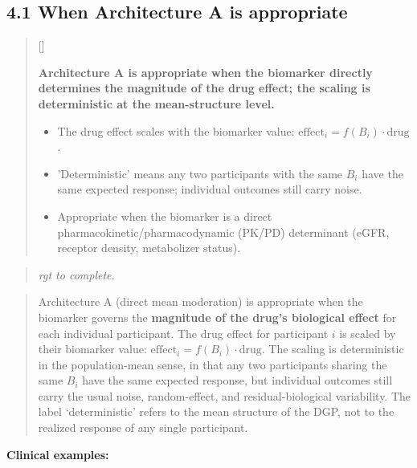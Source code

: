 \documentclass[
  11pt,
]{article}
\newcounter{pgraph}
\newenvironment{bullets}{%
  \stepcounter{pgraph}%
  \begin{quote}\small\sffamily\color[gray]{0.30}%
  {\normalfont\scriptsize\color[gray]{0.58}[\thepgraph]\enspace}}{%
  \end{quote}}
\newenvironment{rgt}{%
  \begin{quote}\small\itshape\color[RGB]{20,60,160}}{%
  \end{quote}}
\newenvironment{orig}{%
  \begin{quote}\normalsize\color[gray]{0.55}}{%
  \end{quote}}
\begin{document}
\subsection{4.1 When Architecture A is appropriate}

\begin{bullets}

\textbf{Architecture A is appropriate when the biomarker
directly determines the magnitude of the drug effect; the
scaling is deterministic at the mean-structure level.}

\begin{itemize}\setlength{\itemsep}{2pt}\setlength{\parskip}{0pt}
\item The drug effect scales with the biomarker value:
  $\text{effect}_i = f(B_i) \cdot \text{drug}$.
\item 'Deterministic' means any two participants with the same
  $B_i$ have the same expected response; individual outcomes
  still carry noise.
\item Appropriate when the biomarker is a direct
  pharmacokinetic/pharmacodynamic (PK/PD)
  determinant (eGFR, receptor density, metabolizer status).
\end{itemize}

\end{bullets}

\begin{rgt}
rgt to complete.

\end{rgt}

\begin{orig}
Architecture A (direct mean moderation) is appropriate when the
biomarker governs the \textbf{magnitude of the drug's biological
effect} for each individual participant. The drug effect for participant
\(i\) is scaled by their biomarker value:
\(\text{effect}_i = f(B_i) \cdot \text{drug}\). The scaling is
deterministic in the population-mean sense, in that any two participants
sharing the same \(B_i\) have the same expected response, but individual
outcomes still carry the usual noise, random-effect, and
residual-biological variability. The label `deterministic' refers to the
mean structure of the DGP, not to the realized response of any single
participant.

\end{orig}

\textbf{Clinical examples:}
\end{document}
